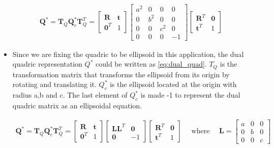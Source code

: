 \documentclass{article}
\begin{document}
\begin{itemize}
\begin{equation}
{\begin{aligned}
\mathbf{Q}^{*}=\mathbf{T}_{Q} \mathbf{Q}_{c}^{*} \mathbf{T}_{Q}^{T}=\left[\begin{array}{cc}
\mathbf{R} & \mathbf{t} \\
\mathbf{0}^{T} & 1
\end{array}\right]\left[\begin{array}{cccc}
a^2 & 0 & 0 & 0\\
0 & b^2 & 0 & 0\\
0 & 0 & c^2 & 0\\
0 & 0 & 0 & -1
\end{array}\right]\left[\begin{array}{cc}
\mathbf{R}^{T} & \mathbf{0} \\
\mathbf{t}^{T} & 1
\end{array}\right] \quad 
\end{aligned}
} \label{eq:dual_quad}
\end{equation}
\item Since we are fixing the quadric to be ellipsoid in this application, the dual quadric representation $Q^{*}$ could be written as  \ref{eq:dual_quad}. ${T}_{Q}$ is the transformation matrix that transforms the ellipsoid from its origin by rotating and translating it. ${Q}_{c}^{*}$ is the ellipsoid located at the origin with radius a,b and c. The last element of ${Q}_{c}^{*}$ is made -1 to represent the dual quadric matrix as an ellipsoidal equation.

\begin{equation}
{
\begin{aligned}
\mathbf{Q}^{*}=\mathbf{T}_{Q} \mathbf{Q}_{c}^{*} \mathbf{T}_{Q}^{T}=\left[\begin{array}{cc}
\mathbf{R} & \mathbf{t} \\
\mathbf{0}^{T} & 1
\end{array}\right]\left[\begin{array}{cc}
\mathbf{L L}^{T} & \mathbf{0} \\
\mathbf{0} & -1
\end{array}\right]\left[\begin{array}{cc}
\mathbf{R}^{T} & \mathbf{0} \\
\mathbf{t}^{T} & 1
\end{array}\right] \quad \text { where } \quad \mathbf{L}=\left[\begin{array}{lll}
a & 0 & 0 \\
0 & b & 0 \\
0 & 0 & c
\end{array}\right]
\end{aligned}
} \label{eq:dual_quad_upd}
\end{equation}


\end{itemize}
\end{document}
